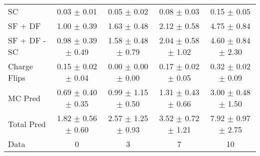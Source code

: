 \begin{tabular}{l|cccc}
                                 SC &  0.03 $\pm$  0.01 &  0.05 $\pm$  0.02 &  0.08 $\pm$  0.03 &  0.15 $\pm$  0.05 \\
                            SF + DF &  1.00 $\pm$  0.39 &  1.63 $\pm$  0.48 &  2.12 $\pm$  0.58 &  4.75 $\pm$  0.84 \\
\hline
                       SF + DF - SC &  0.98 $\pm$  0.39 $\pm$  0.49 &  1.58 $\pm$  0.48 $\pm$  0.79 &  2.04 $\pm$  0.58 $\pm$  1.02 &  4.60 $\pm$  0.84 $\pm$  2.30 \\
\hline\hline
                       Charge Flips &  0.15 $\pm$  0.02 $\pm$  0.04 &  0.00 $\pm$  0.00 $\pm$  0.00 &  0.17 $\pm$  0.02 $\pm$  0.05 &  0.32 $\pm$  0.02 $\pm$  0.09 \\
\hline
                            MC Pred &  0.69 $\pm$  0.40 $\pm$  0.35 &  0.99 $\pm$  1.15 $\pm$  0.50 &  1.31 $\pm$  0.43 $\pm$  0.66 &  3.00 $\pm$  0.48 $\pm$  1.50 \\
\hline
                         Total Pred &  1.82 $\pm$  0.56 $\pm$  0.60 &  2.57 $\pm$  1.25 $\pm$  0.93 &  3.52 $\pm$  0.72 $\pm$  1.21 &  7.92 $\pm$  0.97 $\pm$  2.75 \\
\hline\hline
                               Data &     0 &     3 &     7 &    10 \\
\hline\hline
\end{tabular}

